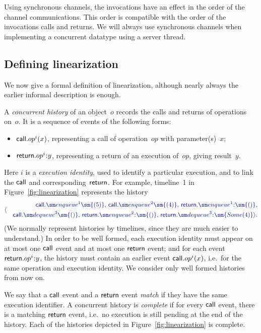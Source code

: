 Using synchronous channels, the invocations have an effect in the order of the
channel communications.  This order is compatible with the order of the
invocations calls and returns.  We will always use synchronous channels when
implementing a concurrent datatype using a server thread.


\subsection{Defining linearization}

We now give a formal definition of linearization, although nearly always the
earlier informal description is enough.  

A \emph{concurrent history} of an object~$o$ records the calls and returns of
operations on~$o$.  It is a sequence of events of the following forms:
%
\begin{itemize}
\item $\mathsf{call}.op^i(x)$, representing a call of operation~$op$ with
  parameter(s)~$x$;
\item $\return.op^i \:: y$, representing a return of an execution of~$op$,
  giving result~$y$.
\end{itemize}
%
Here $i$ is a \emph{execution identity}, used to identify a particular
execution, and to link the $\mathsf{call}$ and corresponding~$\mathsf{return}$.  For example,
timeline~1 in Figure~\ref{fig:linearization} represents the history
\[\mstyle
\langle
  \begin{align}
  \call.\enqueue^1\sm{(5)},\, \call.\enqueue^2\sm{(4)},\,
  \return.\enqueue^1\::\sm{()}, \\
  \quad \call.\dequeue^3\sm{()},\, \return.\enqueue^2\::\sm{()},\,
  \return.\dequeue^3\::\sm{Some(4)} \rangle .
  \end{align}
\]
(We normally represent histories by timelines, since they are much easier to
understand.)  In order to be well formed, each execution identity must appear
on at most one $\mathsf{call}$ event and at most one $\mathsf{return}$ event; and for each
event $\return.op^i\::y$, the history must contain an earlier event
$\mathsf{call}.op^i(x)$, i.e.~for the same operation and execution identity.  We
consider only well formed histories from now on.  

We say that a $\mathsf{call}$ event and a $\mathsf{return}$ event \emph{match}
if they have the same execution identifier.  A concurrent history is
\emph{complete} if for every $\mathsf{call}$ event, there is a matching $\mathsf{return}$
event, i.e.~no execution is still pending at the end of the history.  Each of
the histories depicted in Figure~\ref{fig:linearization} is complete. 


